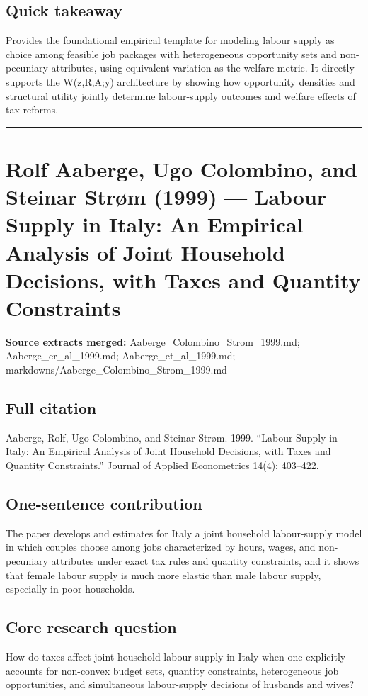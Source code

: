 \documentclass[11pt,a4paper]{article}
\begin{document}
\subsection*{Quick takeaway}
Provides the foundational empirical template for modeling labour supply as choice among feasible job packages with heterogeneous opportunity sets and non-pecuniary attributes, using equivalent variation as the welfare metric. It directly supports the W(z,R,A;y) architecture by showing how opportunity densities and structural utility jointly determine labour-supply outcomes and welfare effects of tax reforms.


\medskip\hrule\medskip

\section*{Rolf Aaberge, Ugo Colombino, and Steinar Strøm (1999) — Labour Supply in Italy: An Empirical Analysis of Joint Household Decisions, with Taxes and Quantity Constraints}

\textbf{Source extracts merged:} Aaberge\_Colombino\_Strom\_1999.md; Aaberge\_er\_al\_1999.md; Aaberge\_et\_al\_1999.md; markdowns/Aaberge\_Colombino\_Strom\_1999.md

\subsection*{Full citation}
Aaberge, Rolf, Ugo Colombino, and Steinar Strøm. 1999. “Labour Supply in Italy: An Empirical Analysis of Joint Household Decisions, with Taxes and Quantity Constraints.” Journal of Applied Econometrics 14(4): 403–422.

\subsection*{One-sentence contribution}
The paper develops and estimates for Italy a joint household labour-supply model in which couples choose among jobs characterized by hours, wages, and non-pecuniary attributes under exact tax rules and quantity constraints, and it shows that female labour supply is much more elastic than male labour supply, especially in poor households.

\subsection*{Core research question}
How do taxes affect joint household labour supply in Italy when one explicitly accounts for non-convex budget sets, quantity constraints, heterogeneous job opportunities, and simultaneous labour-supply decisions of husbands and wives?
\end{document}
